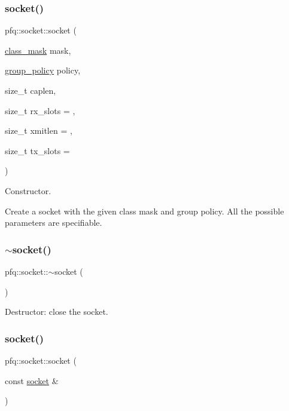 \subsubsection{\texorpdfstring{socket()}{socket()}\hspace{0.1cm}{\footnotesize\ttfamily [5/7]}}
{\footnotesize\ttfamily pfq\+::socket\+::socket (\begin{DoxyParamCaption}\item[{\hyperlink{namespacepfq_a96af1f5ed530eff563eb917516758fbb}{class\+\_\+mask}}]{mask,  }\item[{\hyperlink{namespacepfq_ac41249c8510558905b01fa4d866a38d7}{group\+\_\+policy}}]{policy,  }\item[{size\+\_\+t}]{caplen,  }\item[{size\+\_\+t}]{rx\+\_\+slots = {},  }\item[{size\+\_\+t}]{xmitlen = {},  }\item[{size\+\_\+t}]{tx\+\_\+slots = {} }\end{DoxyParamCaption})\hspace{0.3cm}{\ttfamily [inline]}}



Constructor. 

Create a socket with the given class mask and group policy. All the possible parameters are specifiable. \mbox{\label{classpfq_1_1socket_a08fbdcc1736de36d205282ce20ffbaa3}} 
\subsubsection{\texorpdfstring{$\sim$socket()}{~socket()}}
{\footnotesize\ttfamily pfq\+::socket\+::$\sim$socket (\begin{DoxyParamCaption}{ }\end{DoxyParamCaption})\hspace{0.3cm}{\ttfamily [inline]}}



Destructor\+: close the socket. 

\mbox{\label{classpfq_1_1socket_a517b6fdd622cdb2a64f2960176296f8d}} 
\subsubsection{\texorpdfstring{socket()}{socket()}\hspace{0.1cm}{\footnotesize\ttfamily [6/7]}}
{\footnotesize\ttfamily pfq\+::socket\+::socket (\begin{DoxyParamCaption}\item[{const \hyperlink{classpfq_1_1socket}{socket} \&}]{ }\end{DoxyParamCaption})\hspace{0.3cm}{\ttfamily [delete]}}



